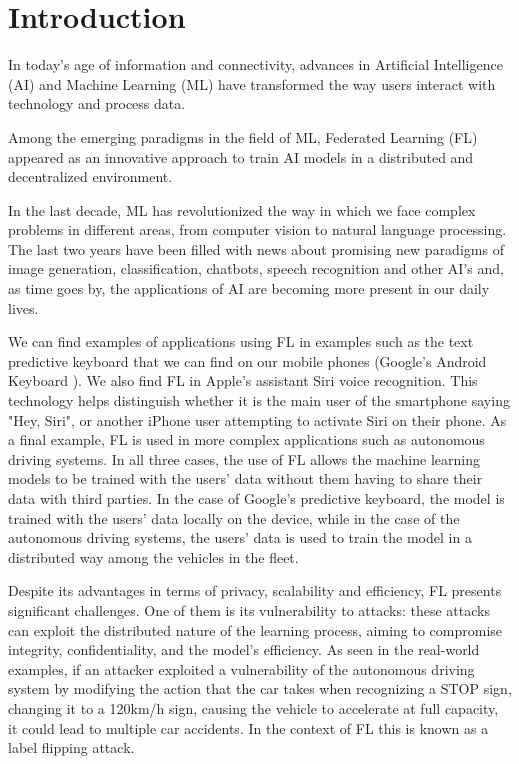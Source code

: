 \section{Introduction}
In today's age of information and connectivity, advances in Artificial Intelligence (AI) and Machine Learning (ML) have transformed the way users interact with technology and process data.

Among the emerging paradigms in the field of ML, Federated Learning (FL) appeared as an innovative approach to train AI models in a distributed and decentralized environment.

In the last decade, ML has revolutionized the way in which we face complex problems in different areas, from computer vision to natural language processing. The last two years have been filled with news about promising new paradigms of image generation, classification, chatbots, speech recognition and other AI's and, as time goes by, the applications of AI are becoming more present in our daily lives.

We can find examples of applications using FL in examples such as the text predictive keyboard that we can find on our mobile phones (Google's Android Keyboard \cite{GoogleKeyboard}). We also find FL in Apple's assistant Siri voice recognition. This technology  helps distinguish whether it is the main user of the smartphone saying "Hey, Siri", or another iPhone user attempting to activate Siri on their phone. As a final example, FL is used in more complex applications such as autonomous driving systems. In all three cases, the use of FL allows the machine learning models to be trained with the users' data without them having to share their data with third parties. In the case of Google's predictive keyboard, the model is trained with the users' data locally on the device, while in the case of the autonomous driving systems, the users' data is used to train the model in a distributed way among the vehicles in the fleet.

Despite its advantages in terms of privacy, scalability and efficiency, FL presents significant challenges. One of them is its vulnerability to attacks: these attacks can exploit the distributed nature of the learning process, aiming to compromise integrity, confidentiality, and the model's efficiency. As seen in the real-world examples, if an attacker exploited a vulnerability of the autonomous driving system by modifying the action that the car takes when recognizing a STOP sign, changing it to a 120km/h sign, causing the vehicle to accelerate at full capacity, it could lead to multiple car accidents. In the context of FL this is known as a label flipping attack.

